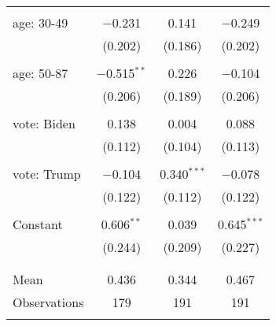 \begin{tabular}{@{\extracolsep{5pt}}lccc}
  & & & \\ 
 age: 30-49 & $-$0.231 & 0.141 & $-$0.249 \\ 
  & (0.202) & (0.186) & (0.202) \\ 
  & & & \\ 
 age: 50-87 & $-$0.515$^{**}$ & 0.226 & $-$0.104 \\ 
  & (0.206) & (0.189) & (0.206) \\ 
  & & & \\ 
 vote: Biden & 0.138 & 0.004 & 0.088 \\ 
  & (0.112) & (0.104) & (0.113) \\ 
  & & & \\ 
 vote: Trump & $-$0.104 & 0.340$^{***}$ & $-$0.078 \\ 
  & (0.122) & (0.112) & (0.122) \\ 
  & & & \\ 
 Constant & 0.606$^{**}$ & 0.039 & 0.645$^{***}$ \\ 
  & (0.244) & (0.209) & (0.227) \\ 
  & & & \\ 
\hline \\[-1.8ex] 
Mean & 0.436 & 0.344 & 0.467 \\ 
Observations & 179 & 191 & 191 \\ 
\hline 
\hline \\[-1.8ex] 
\end{tabular} 

